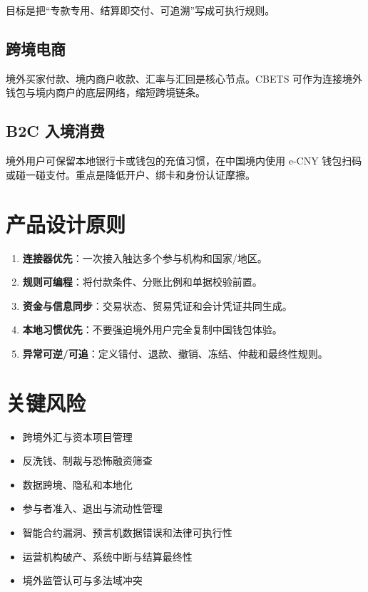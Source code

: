 目标是把``专款专用、结算即交付、可追溯''写成可执行规则。

\subsection{跨境电商}\label{ux8de8ux5883ux7535ux5546}

境外买家付款、境内商户收款、汇率与汇回是核心节点。CBETS
可作为连接境外钱包与境内商户的底层网络，缩短跨境链条。

\subsection{B2C 入境消费}\label{b2c-ux5165ux5883ux6d88ux8d39}

境外用户可保留本地银行卡或钱包的充值习惯，在中国境内使用 e-CNY
钱包扫码或碰一碰支付。重点是降低开户、绑卡和身份认证摩擦。

\section{产品设计原则}\label{ux4ea7ux54c1ux8bbeux8ba1ux539fux5219}

\begin{enumerate}
\def\labelenumi{\arabic{enumi}.}
\tightlist
\item
  \textbf{连接器优先}：一次接入触达多个参与机构和国家/地区。
\item
  \textbf{规则可编程}：将付款条件、分账比例和单据校验前置。
\item
  \textbf{资金与信息同步}：交易状态、贸易凭证和会计凭证共同生成。
\item
  \textbf{本地习惯优先}：不要强迫境外用户完全复制中国钱包体验。
\item
  \textbf{异常可逆/可追}：定义错付、退款、撤销、冻结、仲裁和最终性规则。
\end{enumerate}

\section{关键风险}\label{ux5173ux952eux98ceux9669}

\begin{itemize}
\tightlist
\item
  跨境外汇与资本项目管理
\item
  反洗钱、制裁与恐怖融资筛查
\item
  数据跨境、隐私和本地化
\item
  参与者准入、退出与流动性管理
\item
  智能合约漏洞、预言机数据错误和法律可执行性
\item
  运营机构破产、系统中断与结算最终性
\item
  境外监管认可与多法域冲突
\end{itemize}

